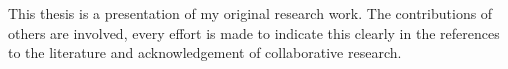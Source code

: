 
\cleardoublepage

{}

\begin{originalitydecl}

This thesis is a presentation of my original research work.
The contributions of others are involved, every effort is made to indicate this clearly in the references to the literature and acknowledgement of collaborative research.

\end{originalitydecl}
